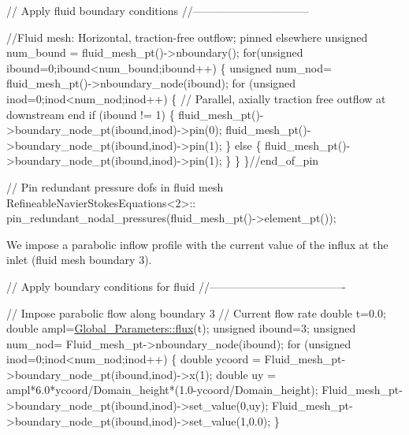 \begin{DoxyCodeInclude}
 
 \textcolor{comment}{// Apply fluid boundary conditions}
 \textcolor{comment}{//--------------------------------}
 
 \textcolor{comment}{//Fluid mesh: Horizontal, traction-free outflow; pinned elsewhere}
 \textcolor{keywordtype}{unsigned} num\_bound = fluid\_mesh\_pt()->nboundary();
 \textcolor{keywordflow}{for}(\textcolor{keywordtype}{unsigned} ibound=0;ibound<num\_bound;ibound++)
  \{
   \textcolor{keywordtype}{unsigned} num\_nod= fluid\_mesh\_pt()->nboundary\_node(ibound);
   \textcolor{keywordflow}{for} (\textcolor{keywordtype}{unsigned} inod=0;inod<num\_nod;inod++)
    \{
     \textcolor{comment}{// Parallel, axially traction free outflow at downstream end}
     \textcolor{keywordflow}{if} (ibound != 1)
      \{
       fluid\_mesh\_pt()->boundary\_node\_pt(ibound,inod)->pin(0);
       fluid\_mesh\_pt()->boundary\_node\_pt(ibound,inod)->pin(1);
      \}
     \textcolor{keywordflow}{else}
      \{
       fluid\_mesh\_pt()->boundary\_node\_pt(ibound,inod)->pin(1);
      \}
    \}
  \}\textcolor{comment}{//end\_of\_pin}
 
 \textcolor{comment}{// Pin redundant pressure dofs in fluid mesh}
 RefineableNavierStokesEquations<2>::
  pin\_redundant\_nodal\_pressures(fluid\_mesh\_pt()->element\_pt());

\end{DoxyCodeInclude}


We impose a parabolic inflow profile with the current value of the influx at the inlet (fluid mesh boundary 3).


\begin{DoxyCodeInclude}


 \textcolor{comment}{// Apply boundary conditions for fluid}
 \textcolor{comment}{//-------------------------------------}

 \textcolor{comment}{// Impose parabolic flow along boundary 3}
 \textcolor{comment}{// Current flow rate}
 \textcolor{keywordtype}{double} t=0.0;
 \textcolor{keywordtype}{double} ampl=\hyperlink{namespaceGlobal__Parameters_a536aa5314a6cdb36af852e9513351d55}{Global\_Parameters::flux}(t);
 \textcolor{keywordtype}{unsigned} ibound=3; 
 \textcolor{keywordtype}{unsigned} num\_nod= Fluid\_mesh\_pt->nboundary\_node(ibound);
 \textcolor{keywordflow}{for} (\textcolor{keywordtype}{unsigned} inod=0;inod<num\_nod;inod++)
  \{
   \textcolor{keywordtype}{double} ycoord = Fluid\_mesh\_pt->boundary\_node\_pt(ibound,inod)->x(1); 
   \textcolor{keywordtype}{double} uy = ampl*6.0*ycoord/Domain\_height*(1.0-ycoord/Domain\_height);
   Fluid\_mesh\_pt->boundary\_node\_pt(ibound,inod)->set\_value(0,uy);
   Fluid\_mesh\_pt->boundary\_node\_pt(ibound,inod)->set\_value(1,0.0);    
  \}

\end{DoxyCodeInclude}


